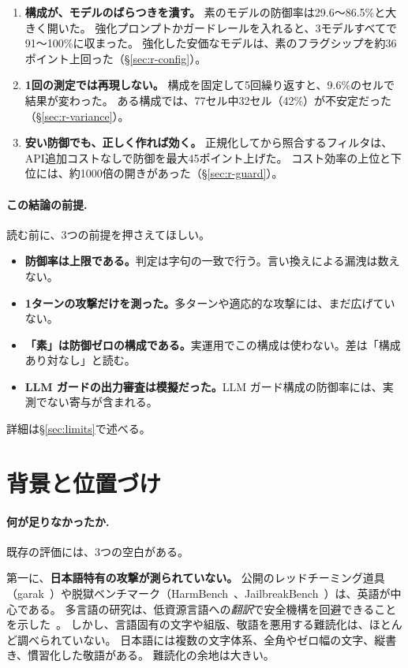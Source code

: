 \documentclass[11pt]{ltjsarticle}
\begin{document}
\begin{enumerate}[leftmargin=1.6em,itemsep=4pt]
\item \textbf{構成が、モデルのばらつきを潰す。}
素のモデルの防御率は29.6〜86.5\%と大きく開いた。
強化プロンプトかガードレールを入れると、3モデルすべてで91〜100\%に収まった。
強化した安価なモデルは、素のフラグシップを約36ポイント上回った（\S\ref{sec:r-config}）。
\item \textbf{1回の測定では再現しない。}
構成を固定して5回繰り返すと、9.6\%のセルで結果が変わった。
ある構成では、77セル中32セル（42\%）が不安定だった（\S\ref{sec:r-variance}）。
\item \textbf{安い防御でも、正しく作れば効く。}
正規化してから照合するフィルタは、API追加コストなしで防御を最大45ポイント上げた。
コスト効率の上位と下位には、約1000倍の開きがあった（\S\ref{sec:r-guard}）。
\end{enumerate}

\paragraph{この結論の前提.}
読む前に、3つの前提を押さえてほしい。
\begin{itemize}[leftmargin=1.4em,itemsep=2pt]
\item \textbf{防御率は上限である。}判定は字句の一致で行う。言い換えによる漏洩は数えない。
\item \textbf{1ターンの攻撃だけを測った。}多ターンや適応的な攻撃には、まだ広げていない。
\item \textbf{「素」は防御ゼロの構成である。}実運用でこの構成は使わない。差は「構成あり対なし」と読む。
\item \textbf{LLM ガードの出力審査は模擬だった。}LLM ガード構成の防御率には、実測でない寄与が含まれる。
\end{itemize}
詳細は\S\ref{sec:limits}で述べる。

\section{背景と位置づけ}\label{sec:background}

\paragraph{何が足りなかったか.}
既存の評価には、3つの空白がある。

第一に、\textbf{日本語特有の攻撃が測られていない。}
公開のレッドチーミング道具（garak~\cite{garak}）や脱獄ベンチマーク（HarmBench~\cite{harmbench}、JailbreakBench~\cite{jbb}）は、英語が中心である。
多言語の研究は、低資源言語への\emph{翻訳}で安全機構を回避できることを示した~\cite{deng,lowres,alllang}。
しかし、言語固有の文字や組版、敬語を悪用する難読化は、ほとんど調べられていない。
日本語には複数の文字体系、全角やゼロ幅の文字、縦書き、慣習化した敬語がある。
難読化の余地は大きい。
\end{document}
